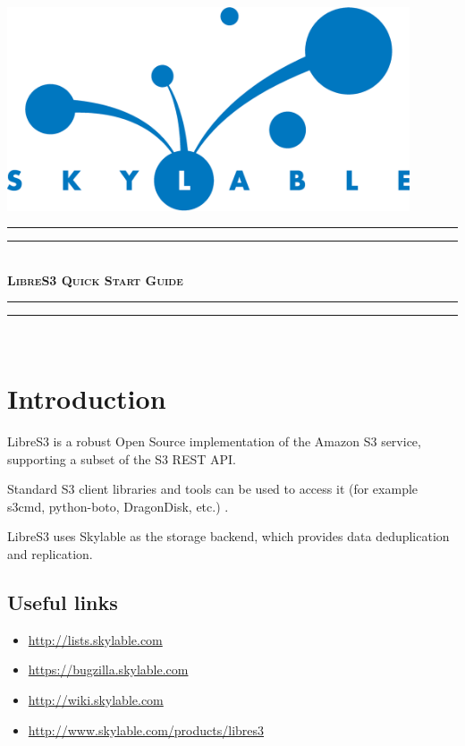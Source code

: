 \pagestyle{empty}

\begin{center}
    \includegraphics[width=119mm]{logo.eps}\\
    \vspace{4cm}
    \rule{\textwidth}{1.6pt}\vspace*{-\baselineskip}\vspace*{2pt}
    \rule{\textwidth}{0.4pt}\\[\baselineskip]
    {\fontsize{40}{50}\bfseries\scshape LibreS3 Quick Start Guide}
    \rule{\textwidth}{0.4pt}\vspace*{-\baselineskip}\vspace{3.2pt}
    \rule{\textwidth}{1.6pt}\\[\baselineskip]
\end{center}


\LARGE
\chapter{Introduction}

\indent LibreS3 is a robust Open Source implementation of the Amazon S3 service,
supporting a subset of the S3 REST API.

Standard S3 client libraries and tools can be used to access it (for example s3cmd, python-boto, DragonDisk, etc.) .

LibreS3 uses Skylable \SX as the storage backend, which provides data
deduplication and replication.\\

\section*{Useful links}
\begin{itemize}
    \item \url{http://lists.skylable.com}
    \item \url{https://bugzilla.skylable.com}
    \item \url{http://wiki.skylable.com}
    \item \url{http://www.skylable.com/products/libres3}
\end{itemize}

